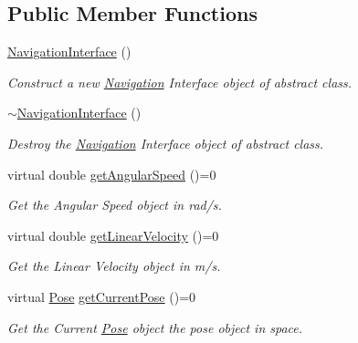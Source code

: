 \subsection*{Public Member Functions}
\begin{DoxyCompactItemize}
\item 
\mbox{\label{classNavigationInterface_ae33d4f7b177fb85615bba6d144a5cb6b}} 
\hyperlink{classNavigationInterface_ae33d4f7b177fb85615bba6d144a5cb6b}{Navigation\+Interface} ()
\begin{DoxyCompactList}\small\item\em Construct a new \hyperlink{classNavigation}{Navigation} Interface object of abstract class. \end{DoxyCompactList}\item 
\mbox{\label{classNavigationInterface_a1f3b72da52b5f8692303f9dcae118f05}} 
\hyperlink{classNavigationInterface_a1f3b72da52b5f8692303f9dcae118f05}{$\sim$\+Navigation\+Interface} ()
\begin{DoxyCompactList}\small\item\em Destroy the \hyperlink{classNavigation}{Navigation} Interface object of abstract class. \end{DoxyCompactList}\item 
virtual double \hyperlink{classNavigationInterface_a9fda3919f625414f9fe68dd03deb3130}{get\+Angular\+Speed} ()=0
\begin{DoxyCompactList}\small\item\em Get the Angular Speed object in rad/s. \end{DoxyCompactList}\item 
virtual double \hyperlink{classNavigationInterface_aa5c9df2654078875f72368e919e28432}{get\+Linear\+Velocity} ()=0
\begin{DoxyCompactList}\small\item\em Get the Linear Velocity object in m/s. \end{DoxyCompactList}\item 
virtual \hyperlink{structPose}{Pose} \hyperlink{classNavigationInterface_ab37e23f5f838c02d7768d2f02b1fe429}{get\+Current\+Pose} ()=0
\begin{DoxyCompactList}\small\item\em Get the Current \hyperlink{structPose}{Pose} object the pose object in space. \end{DoxyCompactList}\end{DoxyCompactItemize}


